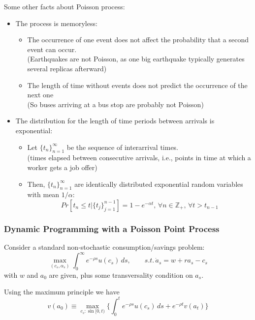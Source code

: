 Some other facts about Poisson process: \begin{itemize}
    \item The process is memoryless: \begin{itemize}
              \item The occurrence of one event does not affect the probability that a second event can occur. \\ (Earthquakes are not Poisson, as one big earthquake typically generates several replicas afterward)
              \item The length of time without events does not predict the occurrence of the next one \\ (So buses arriving at a bus stop are probably not Poisson)
          \end{itemize}
    \item The distribution for the length of time periods between arrivals is exponential: \begin{itemize}
              \item Let $\{t_n\}_{n=1}^\infty$ be the sequence of interarrival times.\\(times elapsed between consecutive arrivals, i.e., points in time at which a worker gets a job offer)
              \item Then, $\{t_n\}_{n=1}^\infty$ are  identically distributed exponential random variables with mean $1/\alpha$: \[
                        Pr[t_n \leq t \Big| \{t_j\}_{j=1}^{n-1}] = 1- e^{-\alpha t}, \, \forall n \in \mathbb{Z}_+, \, \forall t > t_{n-1}
                    \]
          \end{itemize}
\end{itemize}

\subsubsection{Dynamic Programming with a Poisson Point Process}

Consider a standard non-stochastic consumption/savings problem: \[
    \max_{(c_s,\alpha_s)} \int_{0}^{\infty } e^{-\rho s} u(c_s) \, ds, \qquad s.t. \, \dot{a}_s = w + ra_s -c_s
\] with $w$ and $a_0$ are given, plus some transversality condition on $a_s$.

Using the maximum principle we have \[
    v(a_0) \equiv \max_{c_s: \sin [0,t)} \{\int_{0}^{t} e^{-\rho s}u(c_s) \, ds + e^{-\rho t} v(a_t)\}
\]

